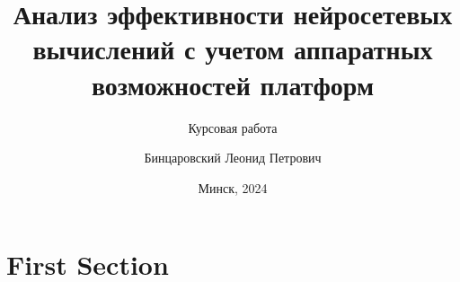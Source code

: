 \documentclass[aspectratio=169,xcolor=dvipsnames]{beamer}
\title{Анализ эффективности нейросетевых вычислений с учетом аппаратных возможностей платформ}
\subtitle{Курсовая работа}
\author[Pin-Yen] {Бинцаровский Леонид Петрович}
\institute[NTU] %
{
    Белорусский государственный университет\\
    ФПМИ, ДМА, 3 курс\\
    руководитель: старший преподаватель Пирштук Д. И.
    \vskip 3pt
}
\date{Минск, 2024} %
\begin{document}
\begin{frame}
    \titlepage
\end{frame}


\section{First Section}
\end{document}
